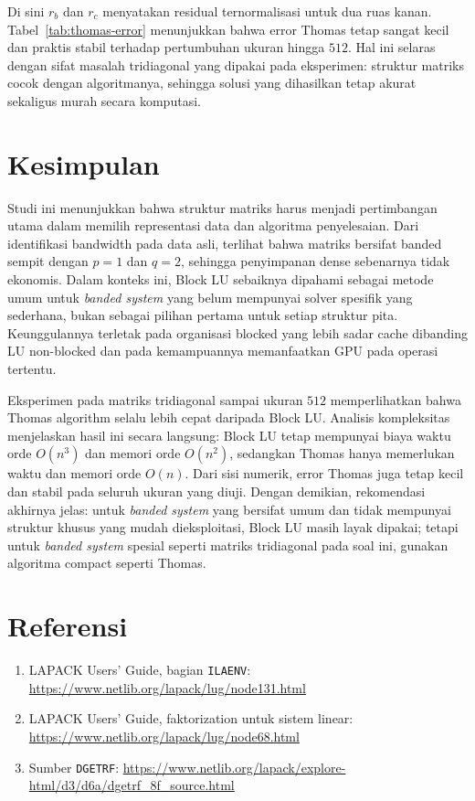 \documentclass[12pt,a4paper]{article}
\begin{document}
Di sini $r_b$ dan $r_c$ menyatakan residual ternormalisasi untuk dua ruas kanan. Tabel~\ref{tab:thomas-error} menunjukkan bahwa error Thomas tetap sangat kecil dan praktis stabil terhadap pertumbuhan ukuran hingga $512$. Hal ini selaras dengan sifat masalah tridiagonal yang dipakai pada eksperimen: struktur matriks cocok dengan algoritmanya, sehingga solusi yang dihasilkan tetap akurat sekaligus murah secara komputasi.

\section{Kesimpulan}
Studi ini menunjukkan bahwa struktur matriks harus menjadi pertimbangan utama dalam memilih representasi data dan algoritma penyelesaian. Dari identifikasi bandwidth pada data asli, terlihat bahwa matriks bersifat banded sempit dengan $p=1$ dan $q=2$, sehingga penyimpanan dense sebenarnya tidak ekonomis. Dalam konteks ini, Block LU sebaiknya dipahami sebagai metode umum untuk \emph{banded system} yang belum mempunyai solver spesifik yang sederhana, bukan sebagai pilihan pertama untuk setiap struktur pita. Keunggulannya terletak pada organisasi blocked yang lebih sadar cache dibanding LU non-blocked dan pada kemampuannya memanfaatkan GPU pada operasi tertentu.

Eksperimen pada matriks tridiagonal sampai ukuran $512$ memperlihatkan bahwa Thomas algorithm selalu lebih cepat daripada Block LU. Analisis kompleksitas menjelaskan hasil ini secara langsung: Block LU tetap mempunyai biaya waktu orde $O(n^3)$ dan memori orde $O(n^2)$, sedangkan Thomas hanya memerlukan waktu dan memori orde $O(n)$. Dari sisi numerik, error Thomas juga tetap kecil dan stabil pada seluruh ukuran yang diuji. Dengan demikian, rekomendasi akhirnya jelas: untuk \emph{banded system} yang bersifat umum dan tidak mempunyai struktur khusus yang mudah dieksploitasi, Block LU masih layak dipakai; tetapi untuk \emph{banded system} spesial seperti matriks tridiagonal pada soal ini, gunakan algoritma compact seperti Thomas.

\section*{Referensi}
\begin{enumerate}[leftmargin=1.25em]
  \item LAPACK Users' Guide, bagian \texttt{ILAENV}: \url{https://www.netlib.org/lapack/lug/node131.html}
  \item LAPACK Users' Guide, faktorization untuk sistem linear: \url{https://www.netlib.org/lapack/lug/node68.html}
  \item Sumber \texttt{DGETRF}: \url{https://www.netlib.org/lapack/explore-html/d3/d6a/dgetrf_8f_source.html}
\end{enumerate}
\end{document}
